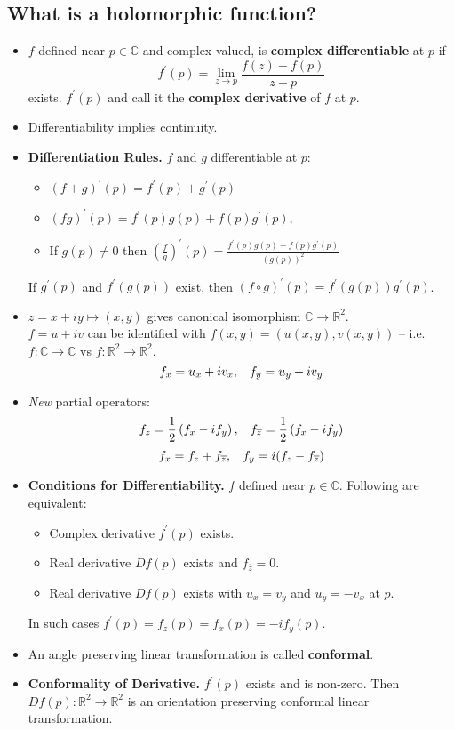 \documentclass{article}
\newenvironment{topic}[1]{%
{\subsection{#1}}%
\begin{itemize}%
}{%
\end{itemize}%
}
\newcommand{\theorem}[1]{\item {\bf #1.}}
\newcommand{\corollary}[1]{\item {\bf #1.}}
\newcommand{\term}[1]{{\bf #1}}
\newcommand{\remark}{\item}
\begin{document}
\begin{topic}{What is a holomorphic function?}

\remark $f$ defined near $p \in \mathbb{C}$ and complex valued, is \term{complex differentiable} at $p$ if $$f^\prime(p) = \lim_{z \to p} \dfrac{f(z) - f(p)}{z - p}$$ exists. $f^\prime(p)$ and call it the \term{complex derivative} of $f$ at $p$.

\remark Differentiability implies continuity.

\theorem{Differentiation Rules} $f$ and $g$ differentiable at $p$:
\begin{itemize}
\item $(f + g)^\prime(p) = f^\prime(p) + g^\prime(p)$
\item $(fg)^\prime(p) = f^\prime(p)g(p) + f(p)g^\prime(p)$,
\item If $g(p) \neq 0$ then $\left(\frac{f}{g}\right)^\prime(p) = \frac{f^\prime(p)g(p) - f(p)g^\prime(p)}{(g(p))^2}$
\end{itemize}
If $g^\prime(p)$ and $f^\prime(g(p))$ exist, then $(f \circ g)^\prime(p) = f^\prime(g(p)) g^\prime(p)$.

\remark $z = x + iy \mapsto (x, y)$ gives canonical isomorphism $\mathbb{C} \to \mathbb{R}^2$.\\
$f = u + iv$ can be identified with $f(x, y) = (u(x, y), v(x, y))$ -- i.e. $f : \mathbb{C} \to \mathbb{C}$ vs $f : \mathbb{R}^2 \to \mathbb{R}^2$.
$$f_x = u_x + i v_x, \hskip 0.3cm f_y = u_y + i v_y$$

\remark {\em New} partial operators: 
$$f_z = \frac{1}{2}\left(f_x - i f_y\right), \hskip 0.3cm f_{\overline{z}} = \frac{1}{2}\left(f_x - i f_y\right)$$
$$f_x = f_z + f_{\overline{z}}, \hskip 0.3cm f_y = i(f_z - f_{\overline{z}})$$

\theorem{Conditions for Differentiability} $f$ defined near $p \in \mathbb{C}$. Following are equivalent:
\begin{itemize}
\item Complex derivative $f^\prime(p)$ exists.
\item Real derivative $Df(p)$ exists and $f_{\overline{z}} = 0$.
\item Real derivative $Df(p)$ exists with $u_x = v_y$ and $u_y = -v_x$ at $p$.
\end{itemize}
In such cases $f^\prime(p) = f_z(p) = f_x(p) = -i f_y(p)$.

\remark An angle preserving linear transformation is called \term{conformal}.

\corollary{Conformality of Derivative} $f^\prime(p)$ exists and is non-zero. Then $Df(p) : \mathbb{R}^2 \to \mathbb{R}^2$ is an orientation preserving conformal linear transformation.


\end{topic}
\end{document}
